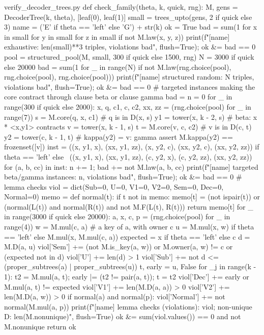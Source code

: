 \begin{filecontents*}[overwrite]{verify_decoder_trees.py}
def check_family(theta, k, quick, rng):
    M, gens = DecoderTree(k, theta), [leaf(0), leaf(1)]
    small = trees_upto(gens, 2 if quick else 3)
    name = ('E' if theta == 'left' else 'G') + str(k)
    ok = True
    bad = sum(1 for x in small for y in small for z in small if not M.law(x, y, z))
    print(f"[{name}] exhaustive: {len(small)**3} triples, violations {bad}", flush=True); ok &= bad == 0
    pool = structured_pool(M, small, 300 if quick else 1500, rng)
    N = 3000 if quick else 20000
    bad = sum(1 for _ in range(N) if not M.law(rng.choice(pool), rng.choice(pool), rng.choice(pool)))
    print(f"[{name}] structured random: {N} triples, violations {bad}", flush=True); ok &= bad == 0
    # targeted instances making the core contract through clause beta or clause gamma
    bad = n = 0
    for _ in range(300 if quick else 2000):
        x, q, c1, c, c2, xx, zz = (rng.choice(pool) for _ in range(7))
        s = M.core(q, x, c1)                     # q is in D(x, s)
        y1 = tower(x, k - 2, s)                  # beta: x * <x,y1> contracts
        v = tower(x, k - 1, s)
        t = M.core(v, c, c2)                     # v is in D(c, t)
        y2 = tower(c, k - 1, t)                  # kappa(y2) = {v}: gamma
        assert M.kappa(y2) == frozenset([v])
        inst = ((x, y1, x), (xx, y1, zz), (x, y2, c), (xx, y2, c), (xx, y2, zz)) if theta == 'left' else \
               ((x, y1, x), (xx, y1, zz), (c, y2, x), (c, y2, zz), (xx, y2, zz))
        for (a, b, cc) in inst:
            n += 1; bad += not M.law(a, b, cc)
    print(f"[{name}] targeted beta/gamma instances: {n}, violations {bad}", flush=True); ok &= bad == 0
    # lemma checks
    viol = dict(Sub=0, U=0, V1=0, V2=0, Sem=0, Dec=0, Normal=0)
    memo = {}
    def normal(t):
        if t not in memo:
            memo[t] = (not ispair(t)) or (normal(L(t)) and normal(R(t)) and not M.F(L(t), R(t)))
        return memo[t]
    for _ in range(3000 if quick else 20000):
        a, x, c, p = (rng.choice(pool) for _ in range(4))
        w = M.mul(c, a)                          # a key of a, with owner c
        u = M.mul(x, w) if theta == 'left' else M.mul(x, M.mul(c, a))
        expected = x if theta == 'left' else c
        d = M.D(a, u)
        viol['Sem'] += (not M.is_key(a, w)) or M.owner(a, w) != c or (expected not in d)
        viol['U'] += len(d) > 1
        viol['Sub'] += not d <= (proper_subtrees(a) | proper_subtrees(u))
        t, early = u, False
        for _j in range(k - 1):
            t2 = M.mul(a, t); early |= (t2 != pair(a, t)); t = t2
        viol['Dec'] += early or M.mul(a, t) != expected
        viol['V1'] += len(M.D(a, a)) > 0
        viol['V2'] += len(M.D(a, w)) > 0
        if normal(a) and normal(p): viol['Normal'] += not normal(M.mul(a, p))
    print(f"[{name}] lemma checks (violations): {viol}; non-unique D: {len(M.nonunique)}", flush=True)
    ok &= sum(viol.values()) == 0 and not M.nonunique
    return ok


\end{filecontents*}
